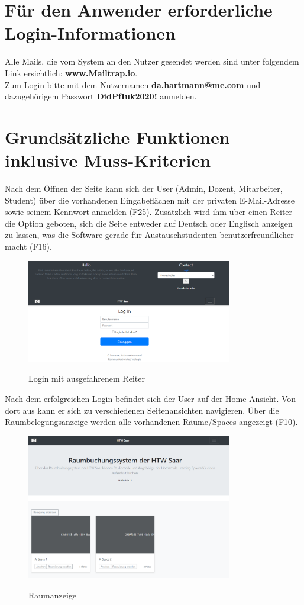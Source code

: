 \documentclass[a4paper,report,headsepline]{scrreprt}
\begin{document}
\section{Für den Anwender erforderliche Login-Informationen}
Alle Mails, die vom System an den Nutzer gesendet werden sind unter folgendem Link ersichtlich: \textbf{www.Mailtrap.io}. \\
Zum Login bitte mit dem Nutzernamen \dq \textbf{da.hartmann@me.com}\dq{} 
und dazugehörigem Passwort \dq  \textbf{DidPfIuk2020!}\dq{} anmelden.
\section{Grundsätzliche Funktionen inklusive Muss-Kriterien}
Nach dem Öffnen der Seite kann sich der User (Admin, Dozent, Mitarbeiter, Student) über die vorhandenen Eingabeflächen mit der privaten E-Mail-Adresse sowie seinem Kennwort anmelden (F25). Zusätzlich wird ihm über einen Reiter die Option geboten, sich die Seite entweder auf Deutsch oder Englisch anzeigen zu lassen, was die Software gerade für Austauschstudenten benutzerfreundlicher macht (F16). 
\begin{figure}[h]
    \centering
    \caption{Login mit ausgefahrenem Reiter}
    \includegraphics[width=0.8\textwidth]{Login mit ausgefahrenem Reiter}
    \label{fig:Login mit ausgefahrenem Reiter}
\end{figure}
Nach dem erfolgreichen Login befindet sich der User auf der Home-Ansicht. Von dort aus kann er sich zu verschiedenen Seitenansichten navigieren. Über die Raumbelegungsanzeige werden alle vorhandenen Räume/Spaces angezeigt (F10).
\begin{figure}[h]
    \centering
    \caption{Raumanzeige}
    \includegraphics[width=0.8\textwidth]{Raumanzeige}
    \label{fig:Raumanzeige}
\end{figure}
\end{document}
